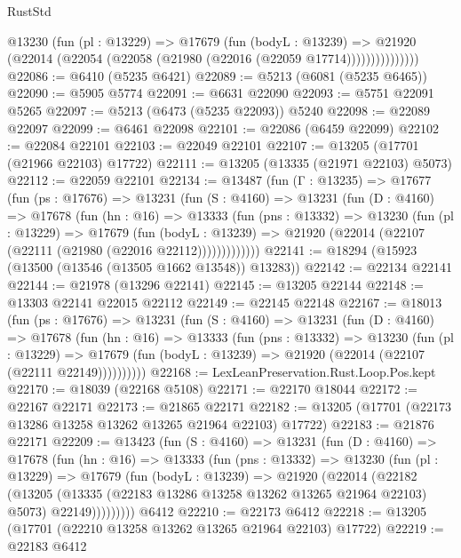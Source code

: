 \begin{lexlean}{RustStd}
\begin{coremodule}
                @13230
                  (fun (pl : @13229) =>
                  @17679
                    (fun (bodyL : @13239) =>
                    @21920 (@22014 (@22054 (@22058 (@21980 (@22016 (@22059 @17714)))))))))))))))
@22086 := @6410 (@5235 @6421)
@22089 := @5213 (@6081 (@5235 @6465))
@22090 := @5905 @5774
@22091 := @6631 @22090
@22093 := @5751 @22091 @5265
@22097 := @5213 (@6473 (@5235 @22093)) @5240
@22098 := @22089 @22097
@22099 := @6461 @22098
@22101 := @22086 (@6459 @22099)
@22102 := @22084 @22101
@22103 := @22049 @22101
@22107 := @13205 (@17701 (@21966 @22103) @17722)
@22111 := @13205 (@13335 (@21971 @22103) @5073)
@22112 := @22059 @22101
@22134 := @13487
    (fun (Γ : @13235) =>
    @17677
      (fun (ps : @17676) =>
      @13231
        (fun (S : @4160) =>
        @13231
          (fun (D : @4160) =>
          @17678
            (fun (hn : @16) =>
            @13333
              (fun (pns : @13332) =>
              @13230
                (fun (pl : @13229) =>
                @17679
                  (fun (bodyL : @13239) =>
                  @21920 (@22014 (@22107 (@22111 (@21980 (@22016 @22112)))))))))))))
@22141 := @18294 (@15923 (@13500 (@13546 (@13505 @1662 @13548)) @13283))
@22142 := @22134 @22141
@22144 := @21978 (@13296 @22141)
@22145 := @13205 @22144
@22148 := @13303 @22141 @22015 @22112
@22149 := @22145 @22148
@22167 := @18013
    (fun (ps : @17676) =>
    @13231
      (fun (S : @4160) =>
      @13231
        (fun (D : @4160) =>
        @17678
          (fun (hn : @16) =>
          @13333
            (fun (pns : @13332) =>
            @13230
              (fun (pl : @13229) =>
              @17679 (fun (bodyL : @13239) => @21920 (@22014 (@22107 (@22111 @22149))))))))))
@22168 := LexLeanPreservation.Rust.Loop.Pos.kept
@22170 := @18039 (@22168 @5108)
@22171 := @22170 @18044
@22172 := @22167 @22171
@22173 := @21865 @22171
@22182 := @13205 (@17701 (@22173 @13286 @13258 @13262 @13265 @21964 @22103) @17722)
@22183 := @21876 @22171
@22209 := @13423
    (fun (S : @4160) =>
    @13231
      (fun (D : @4160) =>
      @17678
        (fun (hn : @16) =>
        @13333
          (fun (pns : @13332) =>
          @13230
            (fun (pl : @13229) =>
            @17679
              (fun (bodyL : @13239) =>
              @21920
                (@22014
                  (@22182
                    (@13205
                      (@13335 (@22183 @13286 @13258 @13262 @13265 @21964 @22103) @5073)
                      @22149)))))))))
    @6412
@22210 := @22173 @6412
@22218 := @13205 (@17701 (@22210 @13258 @13262 @13265 @21964 @22103) @17722)
@22219 := @22183 @6412

\end{coremodule}
\end{lexlean}
